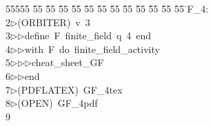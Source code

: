 %
%
\begin{tabbing}
55555 \= 55 \= 55 \= 55 \= 55 \= 55 \= 55 \= 55 \= 55 \= 55 \= 55 \= 55 \= 55 \= \>F\_4:\\[0pt]
2\>$\triangleright$\>(ORBITER)\ v\ 3\ \\[0pt]
3\>$\triangleright$\>$\triangleright$\>define\ F\ finite\_field\ q\ 4\ end\ \\[0pt]
4\>$\triangleright$\>$\triangleright$\>with\ F\ do\ finite\_field\_activity\ \\[0pt]
5\>$\triangleright$\>$\triangleright$\>$\triangleright$\>cheat\_sheet\_GF\ \\[0pt]
6\>$\triangleright$\>$\triangleright$\>end\\[0pt]
7\>$\triangleright$\>(PDFLATEX)\ GF\_4tex\\[0pt]
8\>$\triangleright$\>(OPEN)\ GF\_4pdf\\[0pt]
9\>\end{tabbing}
